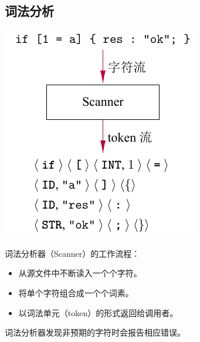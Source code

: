 \documentclass[dvipsnames, svgnames, x11names]{beamer}
\begin{document}
\subsection{词法分析}
\begin{frame}
    \begin{minipage}{.4\linewidth}
    \includegraphics[width=\linewidth]{../figure/scanner.pdf}
    \end{minipage}
    \quad
    \begin{minipage}{.55\linewidth}
    \onslide<+->词法分析器（Scanner）的工作流程：
    \begin{itemize}[<+->]
        \item 从源文件中不断读入一个个字符。
        \item 将单个字符组合成一个个词素。
        \item 以词法单元（token）的形式返回给调用者。
    \end{itemize}
    \onslide<+->词法分析器发现\alert{非预期}的字符时会报告相应错误。
    \end{minipage}
\end{frame}
\end{document}
